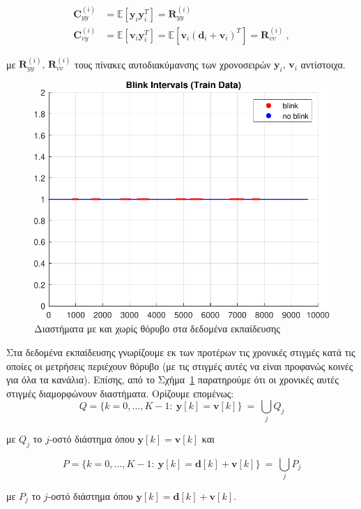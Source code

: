 \documentclass[12pt]{article} %
\begin{document}
\vspace{-7pt}

\[
\begin{aligned}
    \mathbf{C}_{yy}^{(i)} &= \mathbb{E}[\mathbf{y}_i\mathbf{y}_i^T] = \mathbf{R}_{yy}^{(i)} \\
    \mathbf{C}_{vy}^{(i)} &= \mathbb{E}[\mathbf{v}_i\mathbf{y}_i^T] = 
    \mathbb{E}[\mathbf{v}_i(\mathbf{d}_i + \mathbf{v}_i)^T] = \mathbf{R}_{vv}^{(i)} \ ,
\end{aligned}
\]

\vspace{-4pt}

\noindent με $\mathbf{R}_{yy}^{(i)}, \, \mathbf{R}_{vv}^{(i)}$ τους πίνακες αυτοδιακύμανσης των χρονοσειρών
$\mathbf{y}_i, \, \mathbf{v}_i$ αντίστοιχα.

\begin{figure}[ht!]
    \centering
    \includegraphics[width=0.5\linewidth]{plot/clean_and_noisy_intervals.pdf}
    \caption{Διαστήματα με και χωρίς θόρυβο στα δεδομένα εκπαίδευσης}
    \label{fig:clean_and_noisy_intervals}
\end{figure}

Στα δεδομένα εκπαίδευσης γνωρίζουμε εκ των προτέρων τις χρονικές στιγμές κατά τις οποίες οι μετρήσεις 
περιέχουν θόρυβο (με τις στιγμές αυτές να είναι προφανώς κοινές για όλα τα κανάλια). Επίσης, από το 
Σχήμα~\ref{fig:clean_and_noisy_intervals} παρατηρούμε ότι οι χρονικές αυτές στιγμές διαμορφώνουν διαστήματα. 
Ορίζουμε επομένως:
\[
Q = \{k = 0,...,K-1:\  \mathbf{y}[k] = \mathbf{v}[k]\} \  = \  \underset{j}{{\bigcup}} Q_j
\]

\vspace{-10pt}
\noindent με $Q_j$ το $j$-οστό διάστημα όπου $\mathbf{y}[k] = \mathbf{v}[k]$ και

\vspace{-10pt}
\[
P = \{k = 0,...,K-1:\  \mathbf{y}[k] = \mathbf{d}[k] + \mathbf{v}[k]\} \ = \ \underset{j}{{\bigcup}} P_j
\]

\vspace{-10pt}
\noindent με $P_j$ το $j$-οστό διάστημα όπου $\mathbf{y}[k] = \mathbf{d}[k] + \mathbf{v}[k]$. 
\end{document}
